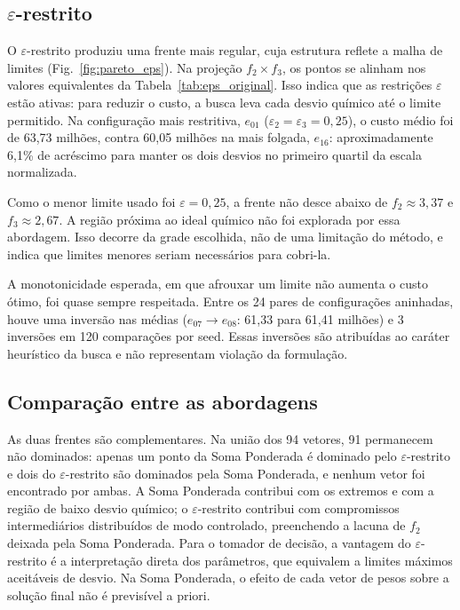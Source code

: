 \documentclass[10pt,twocolumn,a4paper]{article}
\begin{document}
\subsection{$\varepsilon$-restrito}

O $\varepsilon$-restrito produziu uma frente mais regular, cuja estrutura reflete a malha de limites (Fig.~\ref{fig:pareto_eps}). Na projeção $f_2 \times f_3$, os pontos se alinham nos valores equivalentes da Tabela~\ref{tab:eps_original}. Isso indica que as restrições $\varepsilon$ estão ativas: para reduzir o custo, a busca leva cada desvio químico até o limite permitido. Na configuração mais restritiva, $e_{01}$ ($\varepsilon_2 = \varepsilon_3 = 0{,}25$), o custo médio foi de 63,73 milhões, contra 60,05 milhões na mais folgada, $e_{16}$: aproximadamente 6,1\% de acréscimo para manter os dois desvios no primeiro quartil da escala normalizada.

Como o menor limite usado foi $\varepsilon = 0{,}25$, a frente não desce abaixo de $f_2 \approx 3{,}37$ e $f_3 \approx 2{,}67$. A região próxima ao ideal químico não foi explorada por essa abordagem. Isso decorre da grade escolhida, não de uma limitação do método, e indica que limites menores seriam necessários para cobri-la.

A monotonicidade esperada, em que afrouxar um limite não aumenta o custo ótimo, foi quase sempre respeitada. Entre os 24 pares de configurações aninhadas, houve uma inversão nas médias ($e_{07} \to e_{08}$: 61,33 para 61,41 milhões) e 3 inversões em 120 comparações por seed. Essas inversões são atribuídas ao caráter heurístico da busca e não representam violação da formulação.

\subsection{Comparação entre as abordagens}

As duas frentes são complementares. Na união dos 94 vetores, 91 permanecem não dominados: apenas um ponto da Soma Ponderada é dominado pelo $\varepsilon$-restrito e dois do $\varepsilon$-restrito são dominados pela Soma Ponderada, e nenhum vetor foi encontrado por ambas. A Soma Ponderada contribui com os extremos e com a região de baixo desvio químico; o $\varepsilon$-restrito contribui com compromissos intermediários distribuídos de modo controlado, preenchendo a lacuna de $f_2$ deixada pela Soma Ponderada. Para o tomador de decisão, a vantagem do $\varepsilon$-restrito é a interpretação direta dos parâmetros, que equivalem a limites máximos aceitáveis de desvio. Na Soma Ponderada, o efeito de cada vetor de pesos sobre a solução final não é previsível a priori.
\end{document}
